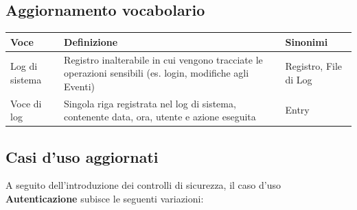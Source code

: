 \documentclass[12pt,a4paper]{report}
\begin{document}
\subsection{Aggiornamento vocabolario}
\begin{tabularx}{\textwidth}{|p{3cm}|X|p{3.5cm}|}
    \hline
    \rowcolor{studyColor} \textbf{Voce} & \textbf{Definizione} & \textbf{Sinonimi} \\ \hline
    \endhead
    Log di sistema & Registro inalterabile in cui vengono tracciate le operazioni sensibili (es. login, modifiche agli Eventi) & Registro, File di Log \\ \hline
    Voce di log & Singola riga registrata nel log di sistema, contenente data, ora, utente e azione eseguita & Entry \\ \hline
\end{tabularx}

\subsection{Casi d'uso aggiornati}
A seguito dell'introduzione dei controlli di sicurezza, il caso d'uso \textbf{Autenticazione} subisce le seguenti variazioni:
\end{document}
